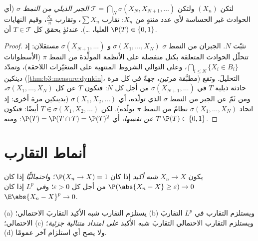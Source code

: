\begin{theorem}
\label{thm:b3:probability:zeroone}
لتكن $(X_n)$  ولتكن $\mathcal T =
\bigcap_N\sigma(X_N, X_{N+1}, \dots)$ \emph{الجبر الذيلي من النمط
$\sigma$} (أي الحوادث غير الحساسة لأي عدد منتهٍ من $X_n$:
تقارب $\sum X_n$، وتقارب $\frac{S_n}n$، وقيم النهايات العليا،
\dots). عندئذٍ يحقق كل $T \in \mathcal T$ أن $\P(T) \in \{0,
1\}$.
\end{theorem}

\begin{proof}
نثبّت $N$. الجبران من النمط $\sigma$ $\sigma(X_1, \dots, X_N)$ و $\sigma(X_{N+1}, \dots)$ مستقلان:
إذ تتحلّل الحوادث المتعلقة بكتل منفصلة على الأنظمة المولِّدة من
النمط $\pi$ (الأسطوانات $\bigcap_{i\leq N}\{X_i \in B_i\}$، وعلى التوالي الشروط المنتهية
على المتغيّرات اللاحقة)، وتمدّد دينكين (\cref{thm:b3:measure:dynkin}، مطبَّقة
مرتين، جهةً في كل مرة) التحليلَ. وتقع حادثة ذيلية $T$ في $\sigma(X_{N+1}, \dots)$
من أجل كل $N$: فتكون $T$  عن كل $\sigma(X_1, \dots, X_N)$، ومن ثَمّ عن
الجبر من النمط $\sigma$ الذي تولّده، أي $\sigma(X_1, X_2, \dots)$ (بدينكين مرة
أخرى: إذ اتحاد $\sigma(X_1,\dots,X_N)$ نظامٌ من النمط $\pi$ يولّده). لكن
$T \in \sigma(X_1, X_2, \dots)$ أيضًا: فتكون $T$  \emph{عن نفسها}، أي $\P(T) = \P(T\cap T) =
\P(T)^2$:
ومنه $\P(T) \in \{0, 1\}$.
\end{proof}

\section{أنماط التقارب}

\begin{definition}\label{def:b3:probability:modes}
يكون $X_n \to X$ \emph{شبه أكيد} إذا كان $\P(X_n \to X) = 1$؛
و\emph{احتماليًّا} إذا كان $\P(\abs{X_n - X} \geq \varepsilon)
\to 0$ من أجل كل $\varepsilon > 0$؛ و\emph{في
$L^p$} إذا كان $\E\abs{X_n - X}^p \to 0$.
\end{definition}

\begin{proposition}\label{prop:b3:probability:modes}
(a) يستلزم التقارب شبه الأكيد التقاربَ الاحتمالي؛
(b) ويستلزم التقارب في $L^p$ التقاربَ الاحتمالي؛
(c) ويستلزم التقارب الاحتمالي التقاربَ شبه الأكيد \emph{على
امتداد متتالية جزئية}؛
(d) ولا يصح أي استلزام آخر عمومًا.
\end{proposition}

